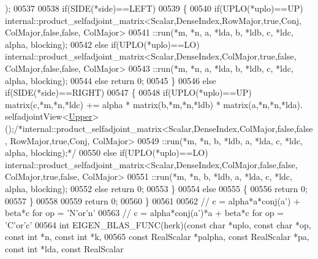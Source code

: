 \begin{DoxyCode}
      );
00537 
00538   \textcolor{keywordflow}{if}(SIDE(*side)==LEFT)
00539   \{
00540     \textcolor{keywordflow}{if}(UPLO(*uplo)==UP)       internal::product\_selfadjoint\_matrix<Scalar,DenseIndex,RowMajor,true,Conj, 
       ColMajor,false,false, ColMajor>
00541                                 ::run(*m, *n, a, *lda, b, *ldb, c, *ldc, alpha, blocking);
00542     \textcolor{keywordflow}{else} \textcolor{keywordflow}{if}(UPLO(*uplo)==LO)  internal::product\_selfadjoint\_matrix<Scalar,DenseIndex,ColMajor,true,false,
       ColMajor,false,false, ColMajor>
00543                                 ::run(*m, *n, a, *lda, b, *ldb, c, *ldc, alpha, blocking);
00544     \textcolor{keywordflow}{else}                      \textcolor{keywordflow}{return} 0;
00545   \}
00546   \textcolor{keywordflow}{else} \textcolor{keywordflow}{if}(SIDE(*side)==RIGHT)
00547   \{
00548     \textcolor{keywordflow}{if}(UPLO(*uplo)==UP)       matrix(c,*m,*n,*ldc) += alpha * matrix(b,*m,*n,*ldb) * matrix(a,*n,*n,*lda).
      selfadjointView<\hyperlink{group__enums_gga39e3366ff5554d731e7dc8bb642f83cda6bcb58be3b8b8ec84859ce0c5ac0aaec}{Upper}>();\textcolor{comment}{/*internal::product\_selfadjoint\_matrix<Scalar,DenseIndex,ColMajor,false,false,
       RowMajor,true,Conj,  ColMajor>}
00549 \textcolor{comment}{                                ::run(*m, *n, b, *ldb, a, *lda, c, *ldc, alpha, blocking);*/}
00550     \textcolor{keywordflow}{else} \textcolor{keywordflow}{if}(UPLO(*uplo)==LO)  internal::product\_selfadjoint\_matrix<Scalar,DenseIndex,ColMajor,false,false,
       ColMajor,true,false, ColMajor>
00551                                 ::run(*m, *n, b, *ldb, a, *lda, c, *ldc, alpha, blocking);
00552     \textcolor{keywordflow}{else}                      \textcolor{keywordflow}{return} 0;
00553   \}
00554   \textcolor{keywordflow}{else}
00555   \{
00556     \textcolor{keywordflow}{return} 0;
00557   \}
00558 
00559   \textcolor{keywordflow}{return} 0;
00560 \}
00561 
00562 \textcolor{comment}{// c = alpha*a*conj(a') + beta*c  for op = 'N'or'n'}
00563 \textcolor{comment}{// c = alpha*conj(a')*a + beta*c  for op  = 'C'or'c'}
00564 \textcolor{keywordtype}{int} EIGEN\_BLAS\_FUNC(herk)(\textcolor{keyword}{const} \textcolor{keywordtype}{char} *uplo, \textcolor{keyword}{const} \textcolor{keywordtype}{char} *op, \textcolor{keyword}{const} \textcolor{keywordtype}{int} *n, \textcolor{keyword}{const} \textcolor{keywordtype}{int} *k,
00565                           \textcolor{keyword}{const} RealScalar *palpha, \textcolor{keyword}{const} RealScalar *pa, \textcolor{keyword}{const} \textcolor{keywordtype}{int} *lda, \textcolor{keyword}{const} RealScalar 

\end{DoxyCode}
